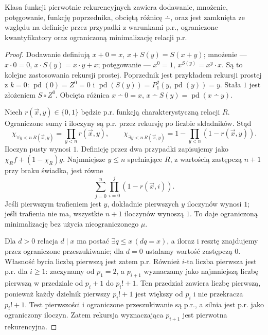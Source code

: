 \begin{lemat}[Zamkniętość p.r.]\label{res:5:8}
Klasa funkcji pierwotnie rekurencyjnych zawiera dodawanie, mnożenie, potęgowanie, funkcję poprzednika, obciętą różnicę $\dotminus$, oraz jest zamknięta ze względu na definicje przez przypadki z warunkami p.r., ograniczone kwantyfikatory oraz ograniczoną minimalizację relacji p.r.
\end{lemat}
\begin{proof}
Dodawanie definiują $x+0=x$, $x+S(y)=S(x+y)$; mnożenie --- $x\cdot0=0$, $x\cdot S(y)=x\cdot y+x$; potęgowanie --- $x^0=1$, $x^{S(y)}=x^y\cdot x$. Są to kolejne zastosowania rekursji prostej. Poprzednik jest przykładem rekursji prostej z $k=0$: $\operatorname{pd}(0)=Z^0=0$ i $\operatorname{pd}(S(y))=P_1^2(y,\operatorname{pd}(y))=y$. Stała $1$ jest złożeniem $S\circ Z^0$. Obcięta różnica $x\dotminus0=x$, $x\dotminus S(y)=\operatorname{pd}(x\dotminus y)$.

Niech $r(\vec x,y)\in\{0,1\}$ będzie p.r. funkcją charakterystyczną relacji $R$. Ograniczone sumy i iloczyny są p.r. przez rekursję po liczbie składników. Stąd
\[
\chi_{\forall y<n\,R(\vec x,y)}=\prod_{y<n}r(\vec x,y),\qquad
\chi_{\exists y<n\,R(\vec x,y)}=1-\prod_{y<n}(1-r(\vec x,y)).
\]
Iloczyn pusty wynosi $1$. Definicję przez dwa przypadki zapisujemy jako $\chi_R f+(1-\chi_R)g$. Najmniejsze $y\le n$ spełniające $R$, z wartością zastępczą $n+1$ przy braku świadka, jest równe
\[
\sum_{j=0}^{n}\prod_{i=0}^{j}(1-r(\vec x,i)).
\]
Jeśli pierwszym trafieniem jest $y$, dokładnie pierwszych $y$ iloczynów wynosi $1$; jeśli trafienia nie ma, wszystkie $n+1$ iloczynów wynoszą $1$. To daje ograniczoną minimalizację bez użycia nieograniczonego $\mu$.

Dla $d>0$ relacja $d\mid x$ ma postać $\exists q\le x\,(dq=x)$, a iloraz i resztę znajdujemy przez ograniczone przeszukiwanie; dla $d=0$ ustalamy wartość zastępczą $0$. Własność bycia liczbą pierwszą jest zatem p.r. Również $i$-ta liczba pierwsza jest p.r. dla $i\ge1$: zaczynamy od $p_1=2$, a $p_{i+1}$ wyznaczamy jako najmniejszą liczbę pierwszą w przedziale od $p_i+1$ do $p_i!+1$. Ten przedział zawiera liczbę pierwszą, ponieważ każdy dzielnik pierwszy $p_i!+1$ jest większy od $p_i$ i nie przekracza $p_i!+1$. Test pierwszości i ograniczone przeszukiwanie są p.r., a silnia jest p.r. jako ograniczony iloczyn. Zatem rekursja wyznaczająca $p_{i+1}$ jest pierwotna rekurencyjna.
\end{proof}

